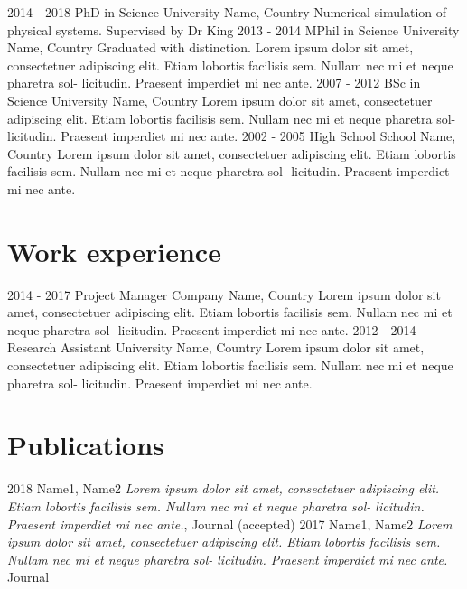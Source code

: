 \documentclass[%
  11pt,
  a4paper]{smooth-banner-cv}
\begin{document}
\begin{richlist}
  \richlistitem
      {2014 - 2018}
      {PhD in Science}
      {University Name, Country}
      {Numerical simulation of physical systems.
      \newline Supervised by Dr King}
   \richlistitem
       {2013 - 2014}
       {MPhil in Science}
       {University Name, Country}
       {Graduated with distinction.
         \newline Lorem ipsum dolor sit amet, consectetuer adipiscing elit. Etiam
         lobortis facilisis sem. Nullam nec mi et neque pharetra sol-
         licitudin. Praesent imperdiet mi nec ante.}
    \richlistitem
       {2007 - 2012}
       {BSc in Science}
       {University Name, Country}
       {Lorem ipsum dolor sit amet, consectetuer adipiscing elit. Etiam
         lobortis facilisis sem. Nullam nec mi et neque pharetra sol-
         licitudin. Praesent imperdiet mi nec ante.}
    \richlistitem
        {2002 - 2005}
        {High School}
        {School Name, Country}
        {Lorem ipsum dolor sit amet, consectetuer adipiscing elit. Etiam
          lobortis facilisis sem. Nullam nec mi et neque pharetra sol-
          licitudin. Praesent imperdiet mi nec ante.}
\end{richlist}

\section{Work experience}

\begin{richlist}
\richlistitem
    {2014 - 2017}
    {Project Manager}
    {Company Name, Country}
    {Lorem ipsum dolor sit amet, consectetuer adipiscing elit. Etiam
      lobortis facilisis sem. Nullam nec mi et neque pharetra sol-
      licitudin. Praesent imperdiet mi nec ante.}
\richlistitem
    {2012 - 2014}
    {Research Assistant}
    {University Name, Country}
    {Lorem ipsum dolor sit amet, consectetuer adipiscing elit. Etiam
      lobortis facilisis sem. Nullam nec mi et neque pharetra sol-
      licitudin. Praesent imperdiet mi nec ante.}
\end{richlist}

\section{Publications}

\begin{simplelist}
   \simplelistitem
       {2018}
       {Name1, Name2 \newline
         \emph{Lorem ipsum dolor sit amet, consectetuer adipiscing elit. Etiam
          lobortis facilisis sem. Nullam nec mi et neque pharetra sol-
          licitudin. Praesent imperdiet mi nec ante.}, \newline Journal (accepted)}
    \simplelistitem
        {2017}
        {Name1, Name2 \newline\emph{Lorem ipsum dolor sit amet, consectetuer adipiscing elit. Etiam
          lobortis facilisis sem. Nullam nec mi et neque pharetra sol-
          licitudin. Praesent imperdiet mi nec ante.} \newline Journal}
\end{simplelist}
\end{document}
